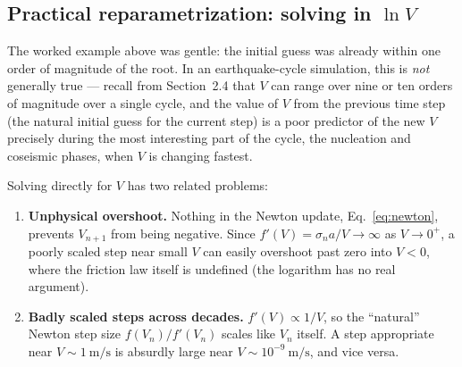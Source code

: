 \subsection{Practical reparametrization: solving in $\ln V$}

The worked example above was gentle: the initial guess was already within one order of magnitude of the root. In an earthquake-cycle simulation, this is \emph{not} generally true --- recall from Section~2.4 that $V$ can range over nine or ten orders of magnitude over a single cycle, and the value of $V$ from the previous time step (the natural initial guess for the current step) is a poor predictor of the new $V$ precisely during the most interesting part of the cycle, the nucleation and coseismic phases, when $V$ is changing fastest.

Solving directly for $V$ has two related problems:
\begin{enumerate}
\item \textbf{Unphysical overshoot.} Nothing in the Newton update, Eq.~\eqref{eq:newton}, prevents $V_{n+1}$ from being negative. Since $f'(V) = \sigma_n a/V \to \infty$ as $V \to 0^+$, a poorly scaled step near small $V$ can easily overshoot past zero into $V<0$, where the friction law itself is undefined (the logarithm has no real argument).
\item \textbf{Badly scaled steps across decades.} $f'(V) \propto 1/V$, so the ``natural'' Newton step size $f(V_n)/f'(V_n)$ scales like $V_n$ itself. A step appropriate near $V \sim 1\ \mathrm{m/s}$ is absurdly large near $V \sim 10^{-9}\ \mathrm{m/s}$, and vice versa.
\end{enumerate}

